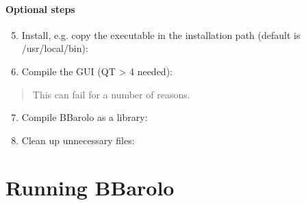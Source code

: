\documentclass[letterpaper,10pt,english]{sphinxmanual}
\begin{document}
\subsubsection{Optional steps}
\label{\detokenize{installing:optional-steps}}\begin{enumerate}
\setcounter{enumi}{4}
\item {} 
Install, e.g. copy the executable in the installation path (default is /usr/local/bin):

\begin{sphinxVerbatim}[commandchars=\\\{\}]
  
\end{sphinxVerbatim}

\item {} 
Compile the GUI (QT \textgreater{} 4 needed):

\begin{sphinxVerbatim}[commandchars=\\\{\}]
  
\end{sphinxVerbatim}

\end{enumerate}
\begin{quote}

This can fail for a number of reasons.
\end{quote}
\begin{enumerate}
\setcounter{enumi}{6}
\item {} 
Compile BBarolo as a library:

\begin{sphinxVerbatim}[commandchars=\\\{\}]
  
\end{sphinxVerbatim}

\item {} 
Clean up unnecessary files:

\begin{sphinxVerbatim}[commandchars=\\\{\}]
  
\end{sphinxVerbatim}

\end{enumerate}


\chapter{Running BBarolo}
\label{\detokenize{running::doc}}\label{\detokenize{running:running-bbarolo}}
\end{document}
